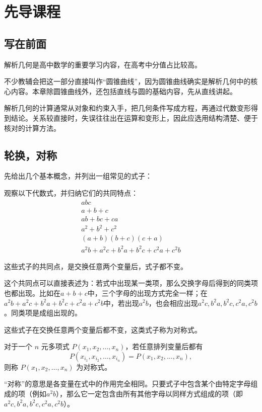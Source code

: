 \chapter{先导课程}
\section{写在前面}
解析几何是高中数学的重要学习内容，在高考中分值占比较高。

不少教辅会把这一部分直接叫作“圆锥曲线”，因为圆锥曲线确实是解析几何中的核心内容。本章除圆锥曲线外，还包括直线与圆的基础内容，先从直线讲起。

解析几何的计算通常从对象和约束入手，把几何条件写成方程，再通过代数变形得到结论。关系较直接时，失误往往出在运算和变形上，因此应选用结构清楚、便于核对的计算方法。
\section{轮换，对称}
先给出几个基本概念，并列出一组常见的式子：
\begin{example}
    观察以下代数式，并归纳它们的共同特点：\vspace{-10pt}
    \begin{gather*}
        abc\\
        a+b+c \\
        ab+bc+ca \\
        a^2+b^2+c^2 \\
        (a+b)(b+c)(c+a)\\
        a^2b + a^2c + b^2a + b^2c + c^2a + c^2b
    \end{gather*}
\end{example}
\begin{solution}
    这些式子的共同点，是交换任意两个变量后，式子都不变。
    
    这个共同点可以直接表述为：若式中出现某一类项，那么交换字母后得到的同类项也都出现。比如在$a+b+c$中，三个字母的出现方式完全一样；在$a^2b + a^2c + b^2a + b^2c + c^2a + c^2b$中，若出现$a^2b$，也会相应出现$a^2c,b^2a,b^2c,c^2a,c^2b$。同类项是成组出现的。
    
    这些式子在交换任意两个变量后都不变，这类式子称为对称式。
\end{solution}
\begin{definition}[对称式]
    对于一个 $n$ 元多项式 $P(x_1, x_2, \dots, x_n)$，若任意排列变量后都有
    \[
    P(x_{i_1}, x_{i_2}, \dots, x_{i_n}) = P(x_1, x_2, \dots, x_n),
    \]
    则称 $P(x_1, x_2, \dots, x_n)$ 为对称式。
\end{definition}
“对称”的意思是各变量在式中的作用完全相同。只要式子中包含某个由特定字母组成的项（例如$a^2b$），那么它一定包含由所有其他字母以同样方式组成的项（即$a^2c,b^2a,b^2c,c^2a,c^2b$）。

